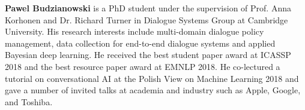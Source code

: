 \begin{bio}




\textbf{Pawel Budzianowski} is a PhD student under the supervision of Prof. Anna Korhonen and Dr. Richard Turner in Dialogue Systems Group at Cambridge University. His research interests include multi-domain dialogue policy management, data collection for end-to-end dialogue systems and applied Bayesian deep learning. He received the best student paper award at ICASSP 2018 and the best resource paper award at EMNLP 2018. He co-lectured a tutorial on conversational AI at the Polish View on Machine Learning 2018 and gave a number of invited talks at academia and industry such as Apple, Google, and Toshiba.



\end{bio}
